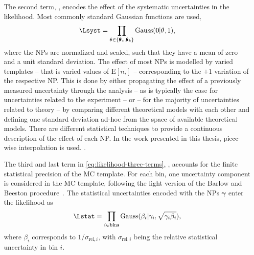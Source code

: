 The second term, \Lsyst, encodes the effect of the systematic uncertainties in the likelihood. Most commonly standard Gaussian functions are used,
\begin{equation}
    \Lsyst = \prod_{\theta \in \{ \pmb{\theta}_s,\pmb{\theta}_b \}} \text{Gauss}(0 | \theta, 1),
\end{equation}
where the NPs are normalized and scaled, such that they have a mean of zero and a unit standard deviation.
The effect of most NPs is modelled by varied templates -- that is varied values of $\text{E}[n_i]$ -- corresponding to the $\pm 1$ variation of the respective NP. This is done by either propagating the effect of a previously measured uncertainty through the analysis -- as is typically the case for uncertainties related to the experiment -- or -- for the majority of uncertainties related to theory -- by comparing different theoretical models with each other and defining one standard deviation ad-hoc from the space of available theoretical models.
There are different statistical techniques to provide a continuous description of the effect of each NP.
In the work presented in this thesis, piece-wise interpolation is used. .

The third and last term in \cref{eq:likelihood-three-terms}, \Lstat, accounts for the finite statistical precision of the MC template. For each bin, one uncertainty component is considered in the MC template, following the light version of the Barlow and Beeston procedure~\cite{BARLOW1993219}. 
The statistical uncertainties encoded with the NPs $\pmb{\gamma}$ enter the likelihood as
\begin{equation}
    \Lstat = \prod_{i \in \text{bins}} \text{Gauss}(\beta_i | \gamma_i, \sqrt{\gamma_i \beta_i}),    
\end{equation}
where $\beta_i$ corresponds to $1 / \sigma_{\text{rel}, i}$, with $\sigma_{\text{rel}, i}$ being the relative statistical uncertainty in bin $i$. 


